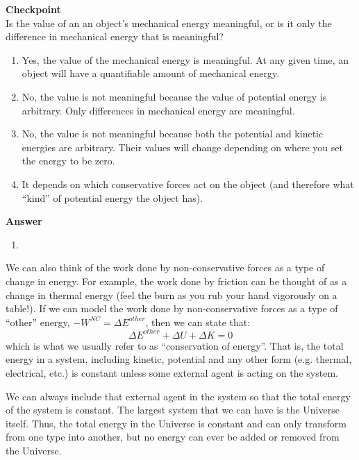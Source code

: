 \begin{framed}
\textbf{Checkpoint}\\
Is the value of an an object's mechanical energy meaningful, or is it only the difference in mechanical energy that is meaningful?

\begin{enumerate}
\item Yes, the value of the mechanical energy is meaningful. At any given time, an object will have a quantifiable amount of mechanical energy.
\item No, the value is not meaningful because the value of potential energy is arbitrary. Only differences in mechanical energy are meaningful.
\item No, the value is not meaningful because both the potential and kinetic energies are arbitrary. Their values will change depending on where you set the energy to be zero.
\item It depends on which conservative forces act on the object (and therefore what ``kind'' of potential energy the object has).
\end{enumerate}

\begin{framed}
\textbf{Answer}\\
\begin{enumerate}[resume]
\item
\end{enumerate}
\end{framed}
\end{framed}

We can also think of the work done by non-conservative forces as a type of change in energy. For example, the work done by friction can be thought of as a change in thermal energy (feel the burn as you rub your hand vigorously on a table!). If we can model the work done by non-conservative forces as a type of ``other'' energy, $-W^{NC}=\Delta E^{other}$, then we can state that:
\begin{equation}
\Delta E^{other} + \Delta U + \Delta K =0
\end{equation}
which is what we usually refer to as ``conservation of energy''. That is, the total energy in a system, including kinetic, potential and any other form (e.g. thermal, electrical, etc.) is constant unless some external agent is acting on the system.

We can always include that external agent in the system so that the total energy of the system is constant. The largest system that we can have is the Universe itself. Thus, the total energy in the Universe is constant and can only transform from one type into another, but no energy can ever be added or removed from the Universe.

